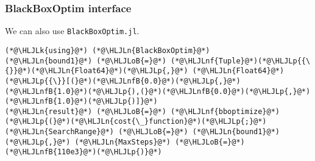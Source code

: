 \documentclass[12pt,a4paper]{article}
\newcommand{\HLJLk}[1]{\textcolor[RGB]{148,91,176}{\textbf{#1}}}
\newcommand{\HLJLn}[1]{#1}
\newcommand{\HLJLnf}[1]{\textcolor[RGB]{66,102,213}{#1}}
\newcommand{\HLJLnfB}[1]{\textcolor[RGB]{59,151,46}{#1}}
\newcommand{\HLJLoB}[1]{\textcolor[RGB]{102,102,102}{\textbf{#1}}}
\newcommand{\HLJLp}[1]{#1}
\begin{document}
\subsubsection{BlackBoxOptim interface}
We can also use \texttt{BlackBoxOptim.jl}.


\begin{lstlisting}
(*@\HLJLk{using}@*) (*@\HLJLn{BlackBoxOptim}@*)
(*@\HLJLn{bound1}@*) (*@\HLJLoB{=}@*) (*@\HLJLnf{Tuple}@*)(*@\HLJLp{{\{}}@*)(*@\HLJLn{Float64}@*)(*@\HLJLp{,}@*) (*@\HLJLn{Float64}@*)(*@\HLJLp{{\}}[(}@*)(*@\HLJLnfB{0.0}@*)(*@\HLJLp{,}@*)(*@\HLJLnfB{1.0}@*)(*@\HLJLp{),(}@*)(*@\HLJLnfB{0.0}@*)(*@\HLJLp{,}@*) (*@\HLJLnfB{1.0}@*)(*@\HLJLp{)]}@*)
(*@\HLJLn{result}@*) (*@\HLJLoB{=}@*) (*@\HLJLnf{bboptimize}@*)(*@\HLJLp{(}@*)(*@\HLJLn{cost{\_}function}@*)(*@\HLJLp{;}@*)(*@\HLJLn{SearchRange}@*) (*@\HLJLoB{=}@*) (*@\HLJLn{bound1}@*)(*@\HLJLp{,}@*) (*@\HLJLn{MaxSteps}@*) (*@\HLJLoB{=}@*) (*@\HLJLnfB{110e3}@*)(*@\HLJLp{)}@*)
\end{lstlisting}
\end{document}
